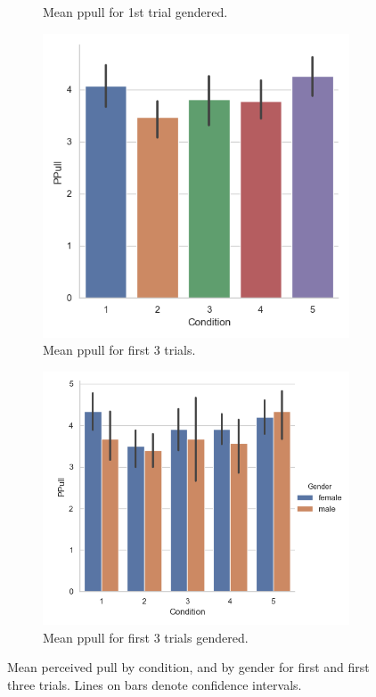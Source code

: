 \begin{figure}[H]
\begin{subfigure}[b]{0.5\textwidth}
     \caption{Mean ppull for 1st trial gendered.}
     \label{fig:meanPPullGen1st}
 \end{subfigure}
  \begin{subfigure}[b]{0.5\textwidth}
     \centering
     \includegraphics[scale=0.5]{Files/Plots/ppull_first_3_trials.png}
     \caption{Mean ppull for first 3 trials.}
     \label{fig:meanPPull3rd}
 \end{subfigure}
     \begin{subfigure}[b]{0.5\textwidth}
     \centering
     \includegraphics[scale=0.5]{Files/Plots/ppull_first_3_trials_gen.png}
     \caption{Mean ppull for first 3 trials gendered.}
     \label{fig:meanPPullGen3rd}
 \end{subfigure}
     \caption{Mean perceived pull by condition, and by gender for first and first three trials. Lines on bars denote confidence intervals.}
    \label{fig:PPull1st3rd}
\end{figure}


